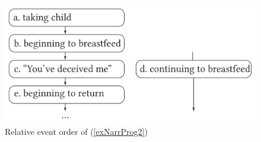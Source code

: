 \begin{figure}[hbt]
\begin{center}
\includegraphics{figures/GrafikRelativeOrderThrowAway.png}
\caption{Relative event order of  (\ref{exNarrProg2})}
\label{FigureRelativeOrderProgressives1}
\end{center}
\end{figure}

